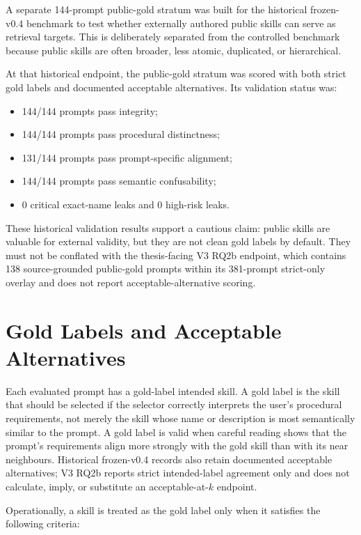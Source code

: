 A separate 144-prompt public-gold stratum was built for the historical frozen-v0.4 benchmark to test whether externally authored public skills can serve as retrieval targets. This is deliberately separated from the controlled benchmark because public skills are often broader, less atomic, duplicated, or hierarchical.

At that historical endpoint, the public-gold stratum was scored with both strict gold labels and documented acceptable alternatives. Its validation status was:

\begin{itemize}
  \item 144/144 prompts pass integrity;
  \item 144/144 prompts pass procedural distinctness;
  \item 131/144 prompts pass prompt-specific alignment;
  \item 144/144 prompts pass semantic confusability;
  \item 0 critical exact-name leaks and 0 high-risk leaks.
\end{itemize}

These historical validation results support a cautious claim: public skills are valuable for external validity, but they are not clean gold labels by default. They must not be conflated with the thesis-facing V3 RQ2b endpoint, which contains 138 source-grounded public-gold prompts within its 381-prompt strict-only overlay and does not report acceptable-alternative scoring.

\section{Gold Labels and Acceptable Alternatives}

Each evaluated prompt has a gold-label intended skill. A gold label is the skill that should be selected if the selector correctly interprets the user's procedural requirements, not merely the skill whose name or description is most semantically similar to the prompt. A gold label is valid when careful reading shows that the prompt's requirements align more strongly with the gold skill than with its near neighbours. Historical frozen-v0.4 records also retain documented acceptable alternatives; V3 RQ2b reports strict intended-label agreement only and does not calculate, imply, or substitute an acceptable-at-$k$ endpoint.

Operationally, a skill is treated as the gold label only when it satisfies the following criteria:

